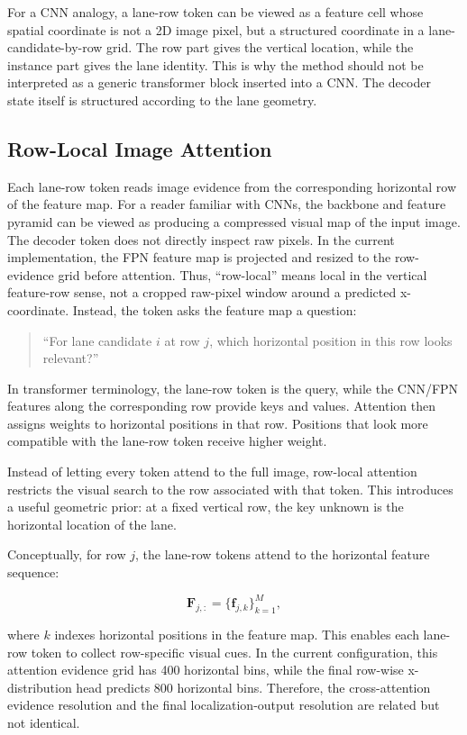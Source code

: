 \documentclass[conference]{IEEEtran}
\begin{document}
For a CNN analogy, a lane-row token can be viewed as a feature cell whose spatial coordinate is not a 2D image pixel, but a structured coordinate in a lane-candidate-by-row grid. The row part gives the vertical location, while the instance part gives the lane identity. This is why the method should not be interpreted as a generic transformer block inserted into a CNN. The decoder state itself is structured according to the lane geometry.

\subsection{Row-Local Image Attention}

Each lane-row token reads image evidence from the corresponding horizontal row of the feature map. For a reader familiar with CNNs, the backbone and feature pyramid can be viewed as producing a compressed visual map of the input image. The decoder token does not directly inspect raw pixels. In the current implementation, the FPN feature map is projected and resized to the row-evidence grid before attention. Thus, ``row-local'' means local in the vertical feature-row sense, not a cropped raw-pixel window around a predicted x-coordinate. Instead, the token asks the feature map a question:

\begin{quote}
``For lane candidate $i$ at row $j$, which horizontal position in this row looks relevant?''
\end{quote}

In transformer terminology, the lane-row token is the query, while the CNN/FPN features along the corresponding row provide keys and values. Attention then assigns weights to horizontal positions in that row. Positions that look more compatible with the lane-row token receive higher weight.

Instead of letting every token attend to the full image, row-local attention restricts the visual search to the row associated with that token. This introduces a useful geometric prior: at a fixed vertical row, the key unknown is the horizontal location of the lane.

Conceptually, for row $j$, the lane-row tokens attend to the horizontal feature sequence:

\begin{equation}
    \mathbf{F}_{j,:} = \{\mathbf{f}_{j,k}\}_{k=1}^{M},
\end{equation}

where $k$ indexes horizontal positions in the feature map. This enables each lane-row token to collect row-specific visual cues. In the current configuration, this attention evidence grid has 400 horizontal bins, while the final row-wise x-distribution head predicts 800 horizontal bins. Therefore, the cross-attention evidence resolution and the final localization-output resolution are related but not identical.
\end{document}
